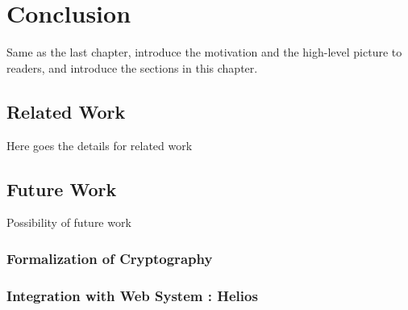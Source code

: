 \chapter{Conclusion}
\label{cha:related_work}
Same as the last chapter, introduce the motivation and the high-level picture to
readers, and introduce the sections in this chapter.

\section{Related Work}
 Here goes the details for related work
\section{Future Work}
 Possibility of future work
 \subsection{Formalization of Cryptography}
 \subsection{Integration with Web System : Helios}
 
 